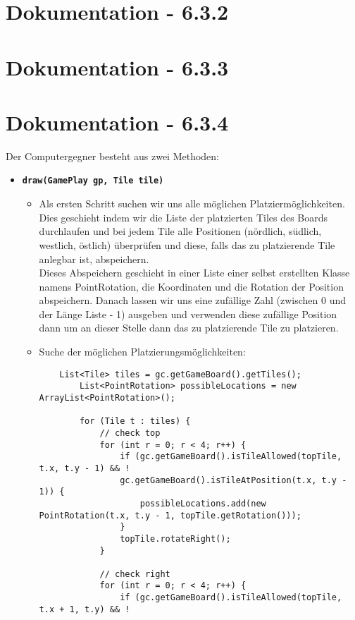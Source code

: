 \section{Dokumentation - 6.3.2}

\section{Dokumentation - 6.3.3}

\pagebreak

\section{Dokumentation - 6.3.4}
Der Computergegner besteht aus zwei Methoden:
\begin{itemize}

\item \textbf{\texttt{draw(GamePlay gp, Tile tile)}}
	\begin{itemize}
	
	\item[]
		Als ersten Schritt suchen wir uns alle möglichen Platziermöglichkeiten. \\
		Dies geschieht indem wir die Liste der platzierten Tiles des Boards durchlaufen und bei jedem Tile 
		alle Positionen (nördlich, südlich, westlich, östlich) überprüfen und diese, falls das zu 
		platzierende Tile anlegbar ist, abspeichern. \\
		Dieses Abspeichern geschieht in einer Liste einer selbst erstellten Klasse namens PointRotation, die 
		Koordinaten und die Rotation der Position abspeichern. Danach lassen wir uns eine zufällige Zahl 
		(zwischen 0 und der Länge Liste - 1) ausgeben und verwenden diese zufällige Position dann um an 
		dieser Stelle dann das zu platzierende Tile zu platzieren.
	
	\item Suche der möglichen Platzierungsmöglichkeiten:
	\begin{lstlisting}
	List<Tile> tiles = gc.getGameBoard().getTiles();
		List<PointRotation> possibleLocations = new ArrayList<PointRotation>();

		for (Tile t : tiles) {
			// check top
			for (int r = 0; r < 4; r++) {
				if (gc.getGameBoard().isTileAllowed(topTile, t.x, t.y - 1) && !	
				gc.getGameBoard().isTileAtPosition(t.x, t.y - 1)) {
					possibleLocations.add(new PointRotation(t.x, t.y - 1, topTile.getRotation()));
				}
				topTile.rotateRight();
			}

			// check right
			for (int r = 0; r < 4; r++) {
				if (gc.getGameBoard().isTileAllowed(topTile, t.x + 1, t.y) && !
				

\end{lstlisting}
\end{itemize}
\end{itemize}

